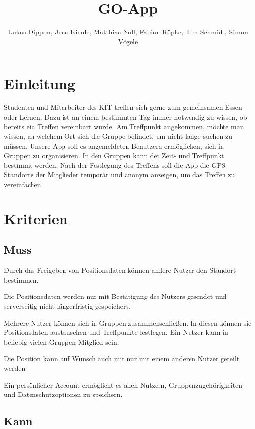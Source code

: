 \documentclass[parskip=full,11pt,twoside]{scrartcl}
\title{GO-App}
\author{Lukas Dippon, Jens Kienle, Matthias Noll, Fabian Röpke, Tim Schmidt, Simon Vögele}
\begin{document}
\maketitle

\section{Einleitung}

Studenten und Mitarbeiter des KIT treffen sich gerne zum gemeinsamen Essen oder Lernen.
Dazu ist an einem bestimmten Tag immer notwendig zu wissen, ob bereits ein Treffen vereinbart wurde.
Am Treffpunkt angekommen, möchte man wissen, an welchem Ort sich die Gruppe befindet, um nicht lange suchen zu müssen.
Unsere App soll es angemeldeten Benutzern ermöglichen, sich in Gruppen zu organisieren.
In den Gruppen kann der Zeit- und Treffpunkt bestimmt werden.
Nach der Festlegung des Treffens soll die App die GPS-Standorte der Mitglieder temporär und anonym anzeigen, um das Treffen zu vereinfachen.

\pagebreak
\section{Kriterien}

\subsection{Muss}

Durch das Freigeben von Positionsdaten können andere Nutzer den
Standort bestimmen.

Die Positionsdaten werden nur mit Bestätigung
des Nutzers gesendet und serverseitig nicht längerfristig gespeichert.

Mehrere Nutzer können sich in Gruppen zusammenschließen. In diesen
können sie Positionsdaten austauschen und Treffpunkte festlegen.
Ein Nutzer kann in beliebig vielen Gruppen Mitglied sein.

Die Position kann auf Wunsch auch mit nur mit einem anderen Nutzer geteilt werden

Ein persönlicher Account ermöglicht es allen Nutzern,
Gruppenzugehörigkeiten und Datenschutzoptionen zu speichern.

\subsection{Kann}
\end{document}
